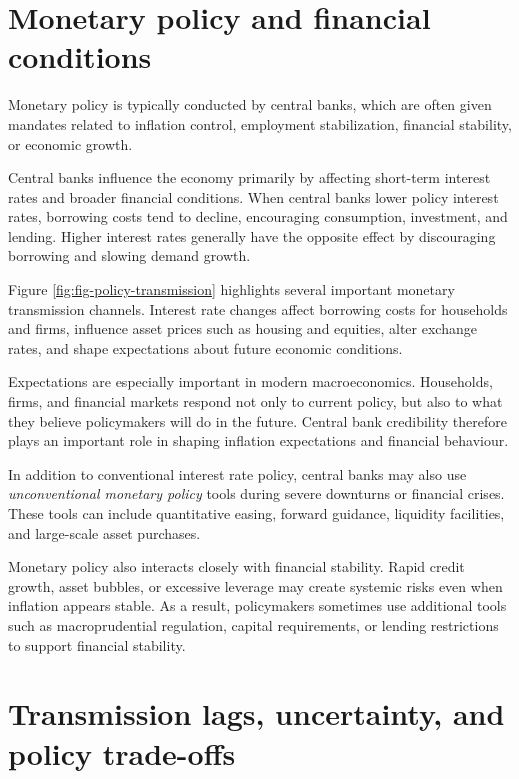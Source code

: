 \documentclass[
  11pt,
  oneside]{book}
\begin{document}
\section{Monetary policy and financial conditions}\label{monetary-policy-and-financial-conditions}

Monetary policy is typically conducted by central banks, which are often given mandates related to inflation control, employment stabilization, financial stability, or economic growth.

Central banks influence the economy primarily by affecting short-term interest rates and broader financial conditions. When central banks lower policy interest rates, borrowing costs tend to decline, encouraging consumption, investment, and lending. Higher interest rates generally have the opposite effect by discouraging borrowing and slowing demand growth.

Figure \ref{fig:fig-policy-transmission} highlights several important monetary transmission channels. Interest rate changes affect borrowing costs for households and firms, influence asset prices such as housing and equities, alter exchange rates, and shape expectations about future economic conditions.

Expectations are especially important in modern macroeconomics. Households, firms, and financial markets respond not only to current policy, but also to what they believe policymakers will do in the future. Central bank credibility therefore plays an important role in shaping inflation expectations and financial behaviour.

In addition to conventional interest rate policy, central banks may also use \emph{unconventional monetary policy} tools during severe downturns or financial crises. These tools can include quantitative easing, forward guidance, liquidity facilities, and large-scale asset purchases.

Monetary policy also interacts closely with financial stability. Rapid credit growth, asset bubbles, or excessive leverage may create systemic risks even when inflation appears stable. As a result, policymakers sometimes use additional tools such as macroprudential regulation, capital requirements, or lending restrictions to support financial stability.

\section{Transmission lags, uncertainty, and policy trade-offs}\label{transmission-lags-uncertainty-and-policy-trade-offs}
\end{document}
